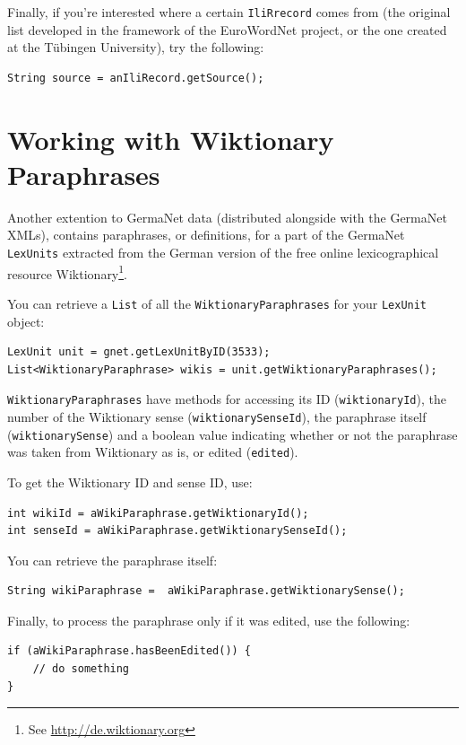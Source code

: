 \documentclass[12pt,a4paper,english,utf8]{report}
\begin{document}
Finally, if you're interested where a certain \texttt{IliRrecord} comes from (the original list developed in the framework of the EuroWordNet project, or the one created at the Tübingen University), try the following:

\begin{lstlisting}
String source = anIliRecord.getSource();
\end{lstlisting}



\section{Working with Wiktionary Paraphrases}
\label{snippetsEnd}
Another extention to GermaNet data (distributed alongside with the GermaNet XMLs), contains paraphrases, or definitions, for a part of the GermaNet \texttt{LexUnits} extracted from the German version of the free online lexicographical resource Wiktionary\footnote{See \href{http://de.wiktionary.org}{http://de.wiktionary.org}}.

You can retrieve a \texttt{List} of all the \texttt{WiktionaryParaphrases} for your \texttt{LexUnit} object:

\begin{lstlisting}
LexUnit unit = gnet.getLexUnitByID(3533);
List<WiktionaryParaphrase> wikis = unit.getWiktionaryParaphrases();
\end{lstlisting}

\begin{sloppypar}
\texttt{WiktionaryParaphrases} have methods for accessing its ID (\texttt{wiktionaryId}), the number of the Wiktionary sense (\texttt{wiktionarySenseId}), the paraphrase itself (\texttt{wiktionarySense}) and a boolean value indicating whether or not the paraphrase was taken from Wiktionary as is, or edited (\texttt{edited}).
\end{sloppypar}

To get the Wiktionary ID and sense ID, use:

\begin{lstlisting}
int wikiId = aWikiParaphrase.getWiktionaryId();
int senseId = aWikiParaphrase.getWiktionarySenseId();
\end{lstlisting}

You can retrieve the paraphrase itself:

\begin{lstlisting}
String wikiParaphrase =  aWikiParaphrase.getWiktionarySense();
\end{lstlisting}

Finally, to process the paraphrase only if it was edited, use the following: 

\begin{lstlisting}
if (aWikiParaphrase.hasBeenEdited()) {
    // do something 
}
\end{lstlisting}
\end{document}
